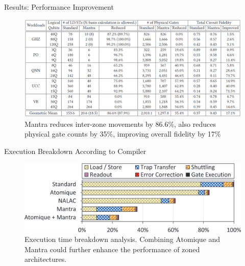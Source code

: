 \documentclass{beamer}
\begin{document}
	
	\begin{frame}{Results: Performance Improvement}
		\centering
		\begin{figure}
			\centering
			\includegraphics[width=.8\textwidth]{figure/res.png}
			\caption[]{Mantra reduces inter-zone movements by 86.6\%, also reduces physical gate counts by 35\%, improving overall fidelity by 17\%}
		\end{figure}
	\end{frame}
	
	\begin{frame}{Execution Breakdown According to Compiler}
		\centering
		\begin{figure}
			\centering
			\includegraphics[width=.8\textwidth]{figure/different.png}
			\caption[]{Execution time breakdown analysis. Combining Atomique and Mantra could further enhance the performance of zoned architectures.}
		\end{figure}
	\end{frame}
	
\end{document}
